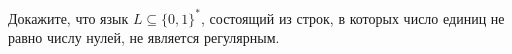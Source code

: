 Докажите, что язык $L \subseteq \{0, 1\}^*$, состоящий из строк, в которых число единиц не равно числу
нулей, не является регулярным.